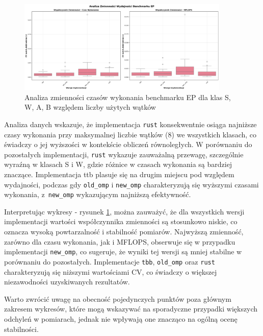 \begin{figure}[H]
    \centering
    \includegraphics[width=0.9\textwidth]{analiza/images/parallel/ep/x86/ep_analiza_zmiennosci.png}
    \caption{Analiza zmienności czasów wykonania benchmarku EP dla klas S, W, A, B względem liczby użytych wątków}
    \label{ep_analiza_zmiennosci_x86_64}
\end{figure}

Analiza danych wskazuje, że implementacja \texttt{rust} konsekwentnie osiąga najniższe czasy wykonania przy maksymalnej liczbie wątków (8) we wszystkich klasach, co świadczy o jej wyższości w kontekście obliczeń równoległych.
W porównaniu do pozostałych implementacji, \texttt{rust} wykazuje zauważalną przewagę, szczególnie wyraźną w klasach S i W, gdzie różnice w czasach wykonania są bardziej znaczące. Implementacja ttb plasuje się na drugim miejscu pod względem wydajności, podczas gdy \texttt{old\_omp} i \texttt{new\_omp} charakteryzują się wyższymi czasami wykonania, z~\texttt{new\_omp} wykazującym najniższą efektywność.

Interpretując wykresy - rysunek \ref{ep_analiza_zmiennosci_x86_64}, można zauważyć, że dla wszystkich wersji implementacji wartości współczynnika zmienności są stosunkowo niskie, co oznacza wysoką powtarzalność i stabilność pomiarów. Najwyższą zmienność, zarówno dla czasu wykonania, jak i MFLOPS, obserwuje się w przypadku implementacji \texttt{new\_omp}, co sugeruje, że wyniki tej wersji są mniej stabilne w porównaniu do pozostałych. Implementacje \texttt{tbb}, \texttt{old\_omp} oraz \texttt{rust} charakteryzują się niższymi wartościami CV, co świadczy o większej niezawodności uzyskiwanych rezultatów.

Warto zwrócić uwagę na obecność pojedynczych punktów poza głównym zakresem wykresów, które mogą wskazywać na sporadyczne przypadki większych odchyleń w pomiarach, jednak nie wpływają one znacząco na ogólną ocenę stabilności.

